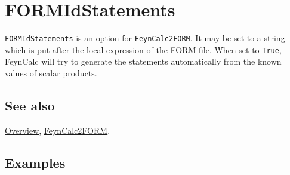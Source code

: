 \documentclass[../FeynCalcManual.tex]{subfiles}
\begin{document}
\hypertarget{formidstatements}{
\section{FORMIdStatements}\label{formidstatements}}

\texttt{FORMIdStatements} is an option for \texttt{FeynCalc2FORM}. It
may be set to a string which is put after the local expression of the
FORM-file. When set to \texttt{True}, FeynCalc will try to generate the
statements automatically from the known values of scalar products.

\subsection{See also}

\hyperlink{toc}{Overview}, \hyperlink{feyncalc2form}{FeynCalc2FORM}.

\subsection{Examples}
\end{document}
